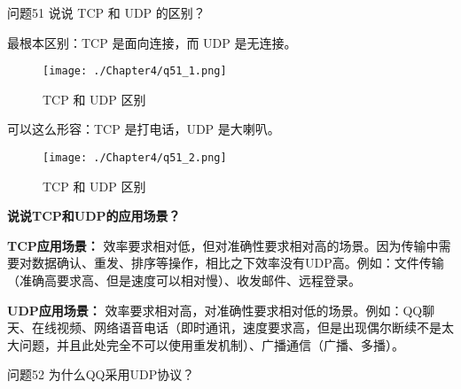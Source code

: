 \documentclass[cn,11pt,color=blue,lang=cn]{elegantbook}
\begin{document}
\begin{custom}{问题51}
说说 TCP 和 UDP 的区别？
\end{custom}

\begin{solution}
最根本区别：TCP 是面向连接，而 UDP 是无连接。

\begin{figure}[!h]
\centering
\texttt{[image: ./Chapter4/q51\_1.png]}
\caption{TCP 和 UDP 区别}
\label{fig51_1}
\end{figure}

可以这么形容：TCP 是打电话，UDP 是大喇叭。
\begin{figure}[!h]
\centering
\texttt{[image: ./Chapter4/q51\_2.png]}
\caption{TCP 和 UDP 区别}
\label{fig51_2}
\end{figure}

\begin{note} \textbf{说说TCP和UDP的应用场景？} \end{note}
\textbf{TCP应用场景：} 效率要求相对低，但对准确性要求相对高的场景。因为传输中需要对数据确认、重发、排序等操作，相比之下效率没有UDP高。例如：文件传输（准确高要求高、但是速度可以相对慢）、收发邮件、远程登录。

\textbf{UDP应用场景：} 效率要求相对高，对准确性要求相对低的场景。例如：QQ聊天、在线视频、网络语音电话（即时通讯，速度要求高，但是出现偶尔断续不是太大问题，并且此处完全不可以使用重发机制）、广播通信（广播、多播）。
\end{solution}


\begin{custom}{问题52}
为什么QQ采用UDP协议？
\end{custom}
\end{document}
